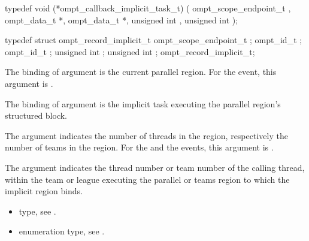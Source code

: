 \label{sec:ompt_callback_implicit_task_t}
\format

\begin{ccppspecific}
\begin{omptCallback}
typedef void (*ompt_callback_implicit_task_t) (
  ompt_scope_endpoint_t ,
  ompt_data_t *,
  ompt_data_t *,
  unsigned int ,
  unsigned int 
);
\end{omptCallback}
\end{ccppspecific}


\record

\begin{ccppspecific}
\begin{omptRecord}
typedef struct ompt_record_implicit_t {
  ompt_scope_endpoint_t ;
  ompt_id_t ;
  ompt_id_t ;
  unsigned int ;
  unsigned int ;
} ompt_record_implicit_t;
\end{omptRecord}
\end{ccppspecific}


\argdesc

\epdesc

The binding of argument  is the current
parallel region.
For the  event, this argument is .

The binding of argument  is the implicit task
executing the parallel region's structured block.

The argument  indicates the number of
threads in the  region, respectively the number of 
teams in the  region.
For the  and the  events, 
this argument is .

The argument  indicates the thread number or team number 
of the calling thread, within the team or league executing the 
parallel or teams region to which the implicit region binds.

\crossreferences
\begin{itemize}
\item {} type, see
.
\item {} enumeration type, see
.
\end{itemize}



